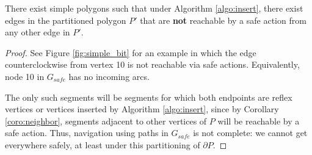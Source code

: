 \documentclass[]{styles/svproc}  %
\begin{document}
\begin{proposition}
There exist simple polygons such that under Algorithm \ref{algo:insert}, there
exist edges in the partitioned polygon $P'$ that are \textbf{not} reachable by 
a safe action from any other edge in $P'$.
\end{proposition}

\begin{proof}
See Figure \ref{fig:simple_bit} for an example in which the edge
counterclockwise from vertex 10 is not reachable via safe actions. Equivalently,
node 10 in $G_{safe}$ has no incoming arcs.

The only such segments will be
segments for which both endpoints are reflex vertices or vertices inserted by Algorithm
\ref{algo:insert}, since by Corollary \ref{coro:neighbor},
segments adjacent to other vertices of $P$ will be reachable by a safe
action. Thus, navigation using paths in $G_{safe}$ is not complete: we cannot
get everywhere safely, at least under this partitioning of $\partial P$.
\end{proof}
\end{document}
